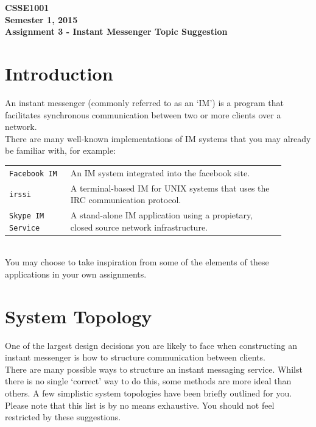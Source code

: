 \documentclass[a4paper, 12pt]{article}
\begin{document}
\begin{center}
\bfseries{ {\Large {CSSE1001}}\\
Semester 1, 2015\\
Assignment 3 - Instant Messenger Topic Suggestion\\}
\end{center}

\section{Introduction}
An instant messenger (commonly referred to as an `IM') is
a program that facilitates synchronous communication between two or more
clients over a network.\\[0.5\baselineskip]
There are many well-known implementations of IM systems that you may already be
familiar with, for example:
{\center
\begin{tabular}{p{0.2\linewidth} p{0.7\linewidth}}
\texttt{Facebook IM} & An IM system integrated into the facebook site.
\\[0.5\baselineskip]
\texttt{irssi} & A terminal-based IM for UNIX systems that uses the IRC
communication protocol.\\
[0.5\baselineskip]
\texttt{Skype IM Service} & A stand-alone IM application using a propietary, 
closed source network infrastructure.\\
[0.5\baselineskip]
\end{tabular}}
\\[\baselineskip]

You may choose to take inspiration from some of the elements of these
applications in your own assignments.\\[0.5\baselineskip]


\section{System Topology}
One of the largest design decisions you are likely to face when constructing an
instant messenger is how to structure communication between clients.\\
There are many possible ways to structure an instant messaging service. Whilst
there is no single `correct' way to do this, some methods are more ideal than
others. A few simplistic system topologies have been briefly outlined for you.
Please note that this list is by no means exhaustive. You should not feel
restricted by these suggestions.
\end{document}
